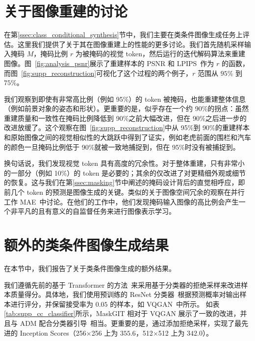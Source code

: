 \newcommand{\suppsection}[1]{\section{{\fontsize{12}{13}\selectfont #1}}}



\suppsection{关于图像重建的讨论}
\label{sec:supp_reconstruction_discussion}

在第\ref{ssec:class_conditional_synthesis}节中，我们主要在类条件图像生成任务上评估\model 。这里我们提供了关于其在图像重建上的性能的更多讨论。我们首先随机采样输入掩码 $M$，掩码比例 $r$ 为被掩码的视觉 token，然后运行\model 的迭代解码算法来重建图像。图~\ref{fig:analysis_psnr}展示了重建样本的 PSNR 和 LPIPS~\cite{zhang2018lpips}作为 $r$ 的函数，而图~\ref{fig:supp_reconstruction}可视化了这个过程的两个例子，$r$ 范围从 $95\%$ 到 $75\%$。


我们观察到即使有非常高比例（例如 95\%）的 token 被掩码，\model 也能重建整体信息（例如前景对象的姿态和形状）。更重要的是，似乎存在一个约 90\%的拐点：虽然重建质量和一致性在掩码比例降低到 90\%之前大幅改进，但在 90\%之后进一步的改进放缓了。这个观察在图~\ref{fig:supp_reconstruction}中从 95\%到 90\%的重建样本和原始图像之间的视觉相似性的大跳跃中得到了证实，例如老虎前面的围栏和汽车的颜色一旦掩码比例低于 90\%就被一致地捕捉到，但在 95\%时没有被捕捉到。

换句话说，我们发现视觉 token 具有高度的冗余性。对于整体重建，只有非常小的一部分（例如 10\%）的 token 是必要的；其余的仅改进了对更精细外观或细节的恢复。这与我们在第\ref{ssec:masking}节中阐述的掩码设计背后的直觉相呼应，即前几个 token 的预测是图像生成的关键。类似的关于图像空间冗余的观察在并行工作 MAE~\cite{he2021mae}中讨论。在他们的工作中，他们发现掩码输入图像的高比例会产生一个非平凡的且有意义的自监督任务来进行图像表示学习。



\suppsection{额外的类条件图像生成结果}
\label{sec:supp_diversity_comparison}

在本节中，我们报告了关于类条件图像生成的额外结果。

我们遵循先前的基于 Transformer 的方法~\cite{Razavi19vqvae2,Esser21vqgan}来采用基于分类器的拒绝采样来改进样本质量得分。具体地，我们使用预训练的 ResNet 分类器~\cite{ResNet}根据预测概率对输出样本进行评分，并保留接受率为 $0.05$ 的样本，如 VQGAN~\cite{Esser21vqgan}中所示。
如表\ref{tab:supp_cc_classifier}所示，MaskGIT 相对于 VQGAN 展示了一致的改进，并且与 ADM 配合分类器引导~\cite{dhariwal2021diffusion}相当。更重要的是，通过添加拒绝采样，\model 实现了最先进的 Inception Scores（256$\times$256 上为 $355.6$，512$\times$512 上为 $342.0$）。



